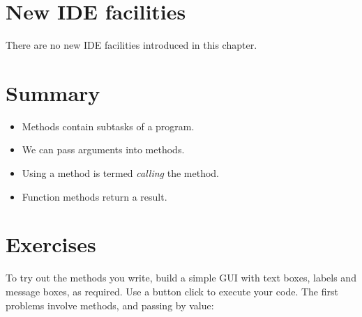 	\section{New IDE facilities}
		There are no new IDE facilities introduced in this chapter.


	\section{Summary}
		\begin{itemize}
			\item Methods contain subtasks of a program.
			\item We can pass arguments into methods.
			\item Using a method is termed \emph{calling} the method.
			\item Function methods return a result.
		\end{itemize}

	\section{Exercises}
		To try out the methods you write, build a simple GUI with text boxes, labels and message boxes, as required. Use a button click to execute your code.
		The first problems involve  methods, and passing by value:

